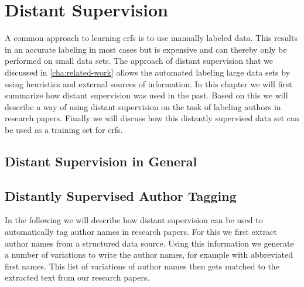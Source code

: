 \chapter{Distant Supervision}\label{cha:distant-supervision}

A common approach to learning \glspl{crf} is to use manually labeled data.
This results in an accurate labeling in most cases but is expensive and can thereby only be performed on small data sets.
The approach of \gls{distant supervision} that we discussed in \cref{cha:related-work} allows the automated labeling large data sets by using heuristics and external sources of information.
In this chapter we will first summarize how \gls{distant supervision} was used in the past. Based on this we will describe a way of using \gls{distant supervision} on the task of labeling authors in research papers. Finally we will discuss how this distantly supervised data set can be used as a training set for \glspl{crf}.\\

%

\section{Distant Supervision in General}
\section{Distantly Supervised Author Tagging}

In the following we will describe how distant supervision can be used to automatically tag author names in research papers.
For this we first extract author names from a structured data source.
Using this information we generate a number of variations to write the author names, for example with abbreviated first names.
This list of variations of author names then gets matched to the extracted text from our research papers.

